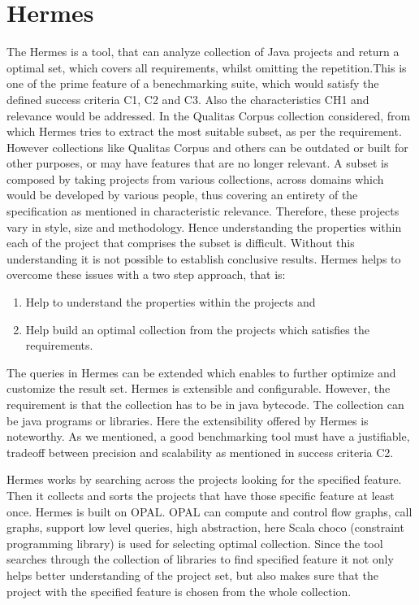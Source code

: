 \documentclass[authoryear,preprint]{sigplanconf}
\begin{document}
\section{Hermes}
\label{sec:sec_hermes}
The Hermes\cite{Reif:2017:HAC:3088515.3088523} is a tool, that can analyze collection of Java projects and return a optimal set, which covers all requirements, whilst omitting the repetition.This is one of the prime feature of a benechmarking suite, which would satisfy the defined success criteria C1, C2 and C3. Also the characteristics CH1 and relevance would be addressed. In the Qualitas Corpus\cite{5693210} \cite{Dingsoyr:2013:RCL:2507288.2507322} collection considered, from which Hermes tries to extract the most suitable subset, as per the requirement. However collections like Qualitas Corpus and others can be outdated or built for other purposes, or may have features that are no longer relevant. A subset is composed by taking projects from various collections, across domains which would be developed by various people, thus covering an entirety of the specification as mentioned in characteristic relevance. Therefore, these projects vary in style, size and methodology. Hence understanding the properties within each of the project that comprises the subset is difficult. Without this understanding it is not possible to establish conclusive results. Hermes helps to overcome these issues with a two step approach, that is:

\begin{enumerate}
	\item Help to understand the properties within the projects and 
	\item Help build an optimal collection from the projects which satisfies the requirements.
\end{enumerate}

The queries in Hermes can be extended which enables to further optimize and customize the result set. Hermes is extensible and configurable. However, the requirement is that the collection has to be in java bytecode. The collection can be java programs or libraries. Here the extensibility offered by Hermes is noteworthy. As we mentioned, a good benchmarking tool must have a justifiable, tradeoff between precision and scalability as mentioned in success criteria C2. 

Hermes works by searching across the projects looking for the specified feature. Then it collects and sorts the projects that have those specific feature at least once. Hermes is built on OPAL. OPAL can compute and control flow graphs, call graphs, support low level queries, high abstraction, here Scala choco (constraint programming library) is used for selecting optimal collection. Since the tool searches through the collection of libraries to find specified feature it not only helps better understanding of the project set, but also makes sure that the project with the specified feature is chosen from the whole collection.
\end{document}
